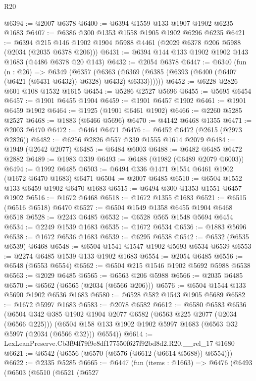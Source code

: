 \begin{lexlean}{R20}
\begin{coremodule}
@6394 := @2007 @6378
@6400 := @6394 @1559 @133 @1907 @1902 @6235 @1683
@6407 := @6386 @300 @1353 @1558 @1905 @1902 @6296 @6235
@6421 := @6394 @215 @146 @1902 @1904 @5988 @4461 (@2029 @6378 @206 @5988 (@2034 (@2035 @6378 @206)))
@6431 := @6394 @144 @133 @1902 @1902 @143 @1683 (@4486 @6378 @20 @143)
@6432 := @2054 @6378
@6447 := @6340
    (fun (n : @26) =>
    @6349
      (@6357
        (@6363 (@6369 (@6385 (@6393 (@6400 (@6407 (@6421 (@6431 @6432)) @6328) @6432) @6333))))))
@6452 := @6228 @2826 @601 @108 @1532 @1615
@6454 := @5286 @2527 @5696
@6455 := @5695 @6454
@6457 := @1901 @6455 @1904
@6459 := @1901 @6457 @1902
@6461 := @1901 @6459 @1902
@6464 := @1925 (@1901 @6461 @1902)
@6466 := @2260 @5285 @2527
@6468 := @1883 (@6466 @5696)
@6470 := @4142 @6468 @1355
@6471 := @2003 @6470
@6472 := @6464 @6471
@6476 := @6452 @6472 (@2615 (@2973 @2826))
@6482 := @6256 @2826 @557 @339 @1555 @1614 @2079
@6484 := @1949 (@2642 @2077)
@6485 := @6484 @6003
@6488 := @6482 @6485 @6472 @2882
@6489 := @1983 @339
@6493 := @6488 (@1982 (@6489 @2079 @6003))
@6494 := @1992 @6485
@6503 := @6494 @336 @1471 @1554 @6461 @1902 (@1672 @6470 @1683) @6471
@6504 := @2007 @6485
@6510 := @6504 @1552 @133 @6459 @1902 @6470 @1683
@6515 := @6494 @300 @1353 @1551 @6457 @1902
@6516 := @1672 @6468
@6518 := @1672 @1355 @1683
@6521 := @6515 (@6516 @6518) @6470
@6527 := @6504 @1549 @1358 @6455 @1904 @6468 @6518
@6528 := @2243 @6485
@6532 := @6528 @565 @1548 @5694 @6454
@6534 := @2249 @1539 @1683
@6535 := @1672 @6534
@6536 := @1883 @5696
@6538 := @1672 @6536 @1683
@6539 := @6295 @6538
@6542 := @6532 (@6535 @6539) @6468
@6548 := @6504 @1541 @1547 @1902 @5693 @6534 @6539
@6553 := @2274 @6485 @1539 @133 @1902 @1683
@6554 := @2054 @6485
@6556 := @6548 (@6553 @6554)
@6562 := @6504 @215 @1546 @1902 @5692 @5988 @6538
@6563 := @2029 @6485
@6565 := @6563 @206 @5988
@6566 := @2035 @6485
@6570 := @6562 (@6565 (@2034 (@6566 @206)))
@6576 := @6504 @1544 @133 @5690 @1902 @6536 @1683
@6580 := @6528 @582 @1543 @1905 @5689
@6582 := @1672 @5997 @1683
@6583 := @2078 @6582
@6612 := @6580
    @6583
    @6536
    (@6504
      @342
      @385
      @1902
      @1904
      @2077
      @6582
      (@6563 @225 @2077 (@2034 (@6566 @225)))
      (@6504 @158 @133 @1902 @1902 @5997 @1683 (@6563 @32 @5997 (@2034 (@6566 @32))) @6554))
@6614 := LexLeanPreserve.Cb3f94f79f9e8df177550f627f92bd8d2.R20.__rel_17 @1680
@6621 := @6542 (@6556 (@6570 (@6576 (@6612 (@6614 @5688)) @6554)))
@6622 := @2335 @5285
@6665 := @6447
    (fun (items : @1663) =>
    @6476
      (@6493
        (@6503
          (@6510
            (@6521
              (@6527

\end{coremodule}
\end{lexlean}
